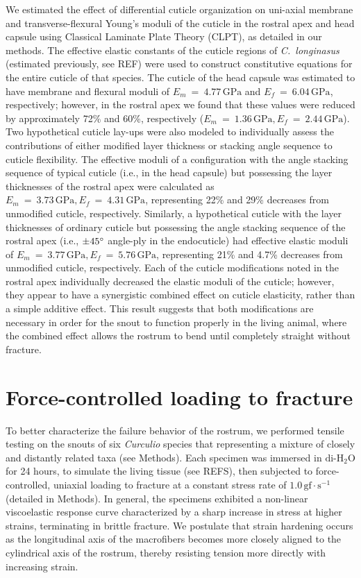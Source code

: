 \documentclass[twocolumn, linenumbers, superscriptaddress, nofootinbib]{revtex4-1}
\begin{document}
		We estimated the effect of differential cuticle organization on uni-axial membrane and transverse-flexural Young's moduli of the cuticle in the rostral apex and head capsule using Classical Laminate Plate Theory (CLPT), as detailed in our methods.
		The effective elastic constants of the cuticle regions of \textit{C.~longinasus} (estimated previously, see REF) were used to construct constitutive equations for the entire cuticle of that species.
		The cuticle of the head capsule was estimated to have membrane and flexural moduli of $E_m~=~4.77\,\text{GPa}$ and $E_f~=~6.04\,\text{GPa}$, respectively; however, in the rostral apex we found that these values were reduced by approximately 72\% and 60\%, respectively ($E_m~=~1.36\,\text{GPa}, E_f~=~2.44\,\text{GPa}$).
		Two hypothetical cuticle lay-ups were also modeled to individually assess the contributions of either modified layer thickness or stacking angle sequence to cuticle flexibility.
		The effective moduli of a configuration with the angle stacking sequence of typical cuticle (i.e., in the head capsule) but possessing the layer thicknesses of the rostral apex were calculated as $E_m~=~3.73\,\text{GPa}, E_f~=~4.31\,\text{GPa}$, representing 22\% and 29\% decreases from unmodified cuticle, respectively.
		Similarly, a hypothetical cuticle with the layer thicknesses of ordinary cuticle but possessing the angle stacking sequence of the rostral apex (i.e., $\pm45\degree$ angle-ply in the endocuticle) had effective elastic moduli of $E_m~=~3.77\,\text{GPa}, E_f~=~5.76\,\text{GPa}$, representing 21\% and 4.7\% decreases from unmodified cuticle, respectively.
		Each of the cuticle modifications noted in the rostral apex individually decreased the elastic moduli of the cuticle; however, they appear to have a synergistic combined effect on cuticle elasticity, rather than a simple additive effect.
		This result suggests that both modifications are necessary in order for the snout to function properly in the living animal, where the combined effect allows the rostrum to bend until completely straight without fracture.
		
	\section{Force-controlled loading to fracture}
		To better characterize the failure behavior of the rostrum, we performed tensile testing on the snouts of six \textit{Curculio} species that representing a mixture of closely and distantly related taxa (see Methods).
		Each specimen was immersed in $\text{di-H}_2\text{O}$ for 24 hours, to simulate the living tissue (see REFS), then subjected to force-controlled, uniaxial loading to fracture at a constant stress rate of $1.0\,\text{gf}\cdot\text{s}^{-1}$ (detailed in Methods).
		In general, the specimens exhibited a non-linear viscoelastic response curve characterized by a sharp increase in stress at higher strains, terminating in brittle fracture.
		We postulate that strain hardening occurs as the longitudinal axis of the macrofibers becomes more closely aligned to the cylindrical axis of the rostrum, thereby resisting tension more directly with increasing strain.
		
\end{document}
